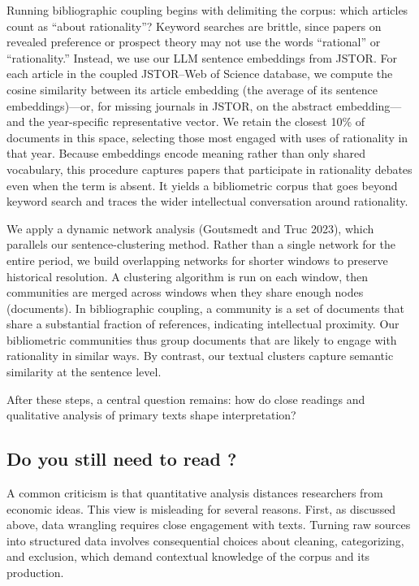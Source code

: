 \documentclass[
]{interact}
\begin{document}
Running bibliographic coupling begins with delimiting the corpus: which
articles count as ``about rationality''? Keyword searches are brittle,
since papers on revealed preference or prospect theory may not use the
words ``rational'' or ``rationality.'' Instead, we use our LLM sentence
embeddings from JSTOR. For each article in the coupled JSTOR--Web of
Science database, we compute the cosine similarity between its article
embedding (the average of its sentence embeddings)---or, for missing
journals in JSTOR, on the abstract embedding---and the year-specific
representative vector. We retain the closest 10\% of documents in this
space, selecting those most engaged with uses of rationality in that
year. Because embeddings encode meaning rather than only shared
vocabulary, this procedure captures papers that participate in
rationality debates even when the term is absent. It yields a
bibliometric corpus that goes beyond keyword search and traces the wider
intellectual conversation around rationality.

We apply a dynamic network analysis (Goutsmedt and Truc 2023), which
parallels our sentence-clustering method. Rather than a single network
for the entire period, we build overlapping networks for shorter windows
to preserve historical resolution. A clustering algorithm is run on each
window, then communities are merged across windows when they share
enough nodes (documents). In bibliographic coupling, a community is a
set of documents that share a substantial fraction of references,
indicating intellectual proximity. Our bibliometric communities thus
group documents that are likely to engage with rationality in similar
ways. By contrast, our textual clusters capture semantic similarity at
the sentence level.

After these steps, a central question remains: how do close readings and
qualitative analysis of primary texts shape interpretation?

\subsection{Do you still need to read
?}\label{do-you-still-need-to-read}

A common criticism is that quantitative analysis distances researchers
from economic ideas. This view is misleading for several reasons. First,
as discussed above, data wrangling requires close engagement with texts.
Turning raw sources into structured data involves consequential choices
about cleaning, categorizing, and exclusion, which demand contextual
knowledge of the corpus and its production.
\end{document}
